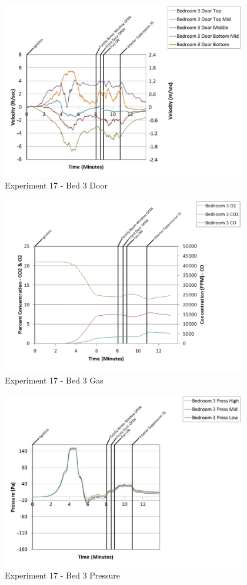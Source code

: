 \documentclass{article}
\begin{document}
\begin{appendices}
	\begin{figure}[h!]
		\centering
		\includegraphics[height=3.05in]{0_Images/Results_Charts/Exp_17_Charts/Bed3Door.pdf}
		\caption{Experiment 17 - Bed 3 Door}
	\end{figure}
 
	\clearpage

	\begin{figure}[h!]
		\centering
		\includegraphics[height=3.05in]{0_Images/Results_Charts/Exp_17_Charts/Bed3Gas.pdf}
		\caption{Experiment 17 - Bed 3 Gas}
	\end{figure}
 

	\begin{figure}[h!]
		\centering
		\includegraphics[height=3.05in]{0_Images/Results_Charts/Exp_17_Charts/Bed3Pressure.pdf}
		\caption{Experiment 17 - Bed 3 Pressure}
	\end{figure}
 

\end{appendices}
\end{document}
